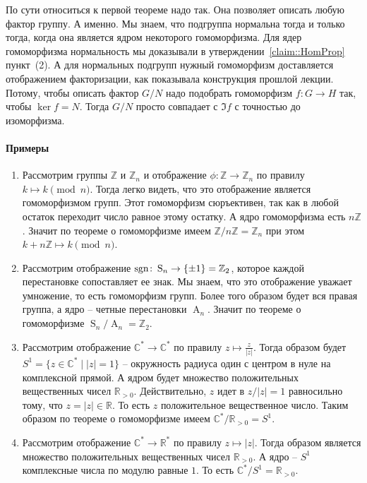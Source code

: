 По сути относиться к первой теореме надо так.
Она позволяет описать любую фактор группу.
А именно.
Мы знаем, что подгруппа нормальна тогда и только тогда, когда она является ядром некоторого гомоморфизма.
Для ядер гомоморфизма нормальность мы доказывали в утверждении~\ref{claim::HomProp} пункт~(2).
А для нормальных подгрупп нужный гомоморфизм доставляется отображением факторизации, как показывала конструкция прошлой лекции.
Потому, чтобы описать фактор $G/ N$ надо подобрать гомоморфизм $f\colon G\to H$ так, чтобы $\ker f = N$.
Тогда $G/N$ просто совпадает с $\Im f$ с точностью до изоморфизма.

\paragraph{Примеры}

\begin{enumerate}
\item Рассмотрим группы $\mathbb Z$ и $\mathbb Z_n$ и отображение $\phi\colon \mathbb Z\to \mathbb Z_n$ по правилу $k \mapsto k \pmod n$.
Тогда легко видеть, что это отображение является гомоморфизмом групп.
Этот гомоморфизм сюръективен, так как в любой остаток переходит число равное этому остатку.
А ядро гомоморфизма есть $n\mathbb Z$.
Значит по теореме о гомоморфизме имеем $\mathbb Z/n \mathbb Z = \mathbb Z_n$ при этом $k+n\mathbb Z \mapsto k \pmod n$.

\item Рассмотрим отображение $\operatorname{sgn} \colon \operatorname{S}_n\to \{\pm 1\} = \mathbb Z_2$, которое каждой перестановке сопоставляет ее знак.
Мы знаем, что это отображение уважает умножение, то есть гомоморфизм групп.
Более того образом будет вся правая группа, а ядро -- четные перестановки $\operatorname{A}_n$.
Значит по теореме о гомоморфизме $\operatorname{S}_n / \operatorname{A}_n= \mathbb Z_2$.

\item Рассмотрим отображение $\mathbb C^* \to \mathbb C^*$ по правилу $ z \mapsto \frac{z}{|z|}$.
Тогда образом будет $S^1 = \{z\in \mathbb C^* \mid |z| = 1\}$ -- окружность радиуса один с центром в нуле на комплексной прямой.
А ядром будет множество положительных вещественных чисел $\mathbb R_{>0}$.
Действительно, $z$ идет в $z / |z| =1 $ равносильно тому, что $z = |z|\in \mathbb R$.
То есть $z$ положительное вещественное число.
Таким образом по теореме о гомоморфизме имеем $\mathbb C^* / \mathbb R_{>0} = S^1$.

\item Рассмотрим отображение $\mathbb C^* \to \mathbb R^*$ по правилу $z \mapsto |z|$.
Тогда образом является множество положительных вещественных чисел $\mathbb R_{>0}$.
А ядро -- $S^1$ комплексные числа по модулю равные $1$.
То есть $\mathbb C^* / S^1 = \mathbb R_{>0}$.
\end{enumerate}

